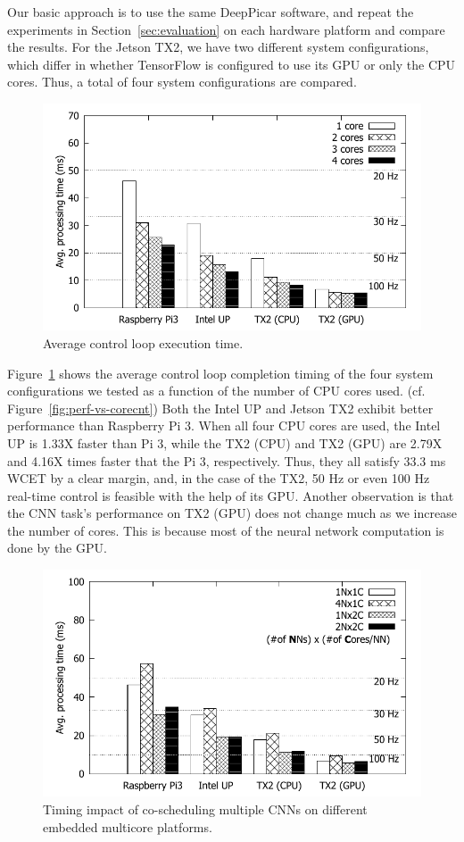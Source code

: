 Our basic approach is to use the same DeepPicar software, and repeat
the experiments in Section~\ref{sec:evaluation} on each hardware
platform and compare the results. 
For the Jetson TX2, we have two different system configurations,
which differ in whether TensorFlow is configured to use its GPU or
only the CPU cores. Thus, a total of four system configurations are
compared.

\begin{figure}[h]
  \centering
  \includegraphics[width=.45\textwidth]{figs/compare_core}
  \caption{Average control loop execution time.} 
  \label{fig:sys_core}
\end{figure}

Figure~\ref{fig:sys_core} shows the average control loop completion
timing of the four system configurations we tested as a function of
the number of CPU cores used. (cf. Figure~\ref{fig:perf-vs-corecnt})
Both the Intel UP and Jetson TX2 exhibit better performance than
Raspberry Pi 3. When all four CPU cores are used, the Intel UP is
1.33X faster than Pi 3, while the TX2 (CPU) and TX2 (GPU) are 2.79X and
4.16X times faster that the Pi 3, respectively.
Thus, they all satisfy 33.3 ms WCET by a clear margin, and, in the
case of the TX2, 50 Hz or even 100 Hz real-time control is feasible
with the help of its GPU.
Another observation is that the CNN task's performance on TX2 (GPU)
does not change much as we increase the number of cores. This
is because most of the neural network computation is done by the GPU.

\begin{figure}[h]
  \centering
  \includegraphics[width=.45\textwidth]{figs/compare_model}
  \caption{Timing impact of co-scheduling multiple CNNs on different
    embedded multicore platforms. %
  }
  \label{fig:sys_model}
\end{figure}

